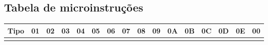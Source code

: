     		\subsection{Tabela de microinstruções}
		
	\begin{center}
		\begin{longtable}[pos]{| c | c | c | c | c | c | c | c | c | c | c | c | c | c | c | c |} \hline
			\multicolumn{1}{|c|}{\cellcolor[gray]{0.9}\textbf{Tipo}} & 
			\multicolumn{1}{c|}{\cellcolor[gray]{0.9}\textbf{01}} & 
			\multicolumn{1}{c|}{\cellcolor[gray]{0.9}\textbf{02}} &
			\multicolumn{1}{c|}{\cellcolor[gray]{0.9}\textbf{03}} &
            			\multicolumn{1}{c|}{\cellcolor[gray]{0.9}\textbf{04}} &
                        			\multicolumn{1}{c|}{\cellcolor[gray]{0.9}\textbf{05}} &
                                    			\multicolumn{1}{c|}{\cellcolor[gray]{0.9}\textbf{06}} &
                                                						\multicolumn{1}{c|}{\cellcolor[gray]{0.9}\textbf{07}} &
                                                                        			\multicolumn{1}{c|}{\cellcolor[gray]{0.9}\textbf{08}} &
                                                                                    \multicolumn{1}{c|}{\cellcolor[gray]{0.9}\textbf{09}} &
                                                                                    \multicolumn{1}{c|}{\cellcolor[gray]{0.9}\textbf{0A}} &
                                                                                    \multicolumn{1}{c|}{\cellcolor[gray]{0.9}\textbf{0B}} &
                                                                                    \multicolumn{1}{c|}{\cellcolor[gray]{0.9}\textbf{0C}} &
                                                                                    \multicolumn{1}{c|}{\cellcolor[gray]{0.9}\textbf{0D}} &
                                                                                                    \multicolumn{1}{c|}{\cellcolor[gray]{0.9}\textbf{0E}} &
                                                                                                                     \multicolumn{1}{c|}{\cellcolor[gray]{0.9}\textbf{00}} \\ \hline
			\endhead
			\hline
			\endlastfoot
			

\end{longtable}
\end{center}
